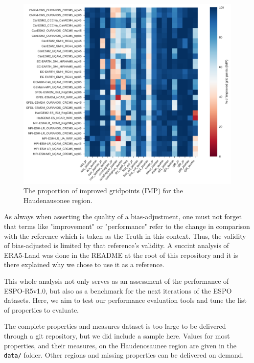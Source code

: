 \documentclass[letterpaper,10pt]{article}
\begin{document}
\begin{figure}
    \centering
    \includegraphics[width=\textwidth]{../images/overall_improvement.pdf}
    \caption{The proportion of improved gridpoints (IMP) for the Haudenausonee region.}\label{fig:imp}
\end{figure}

As always when asserting the quality of a bias-adjustment, one must not forget that terms like "improvement" or "performance" refer to the change in comparison with the reference which is taken as the Truth in this context. Thus, the validity of bias-adjusted is limited by that reference's validity. A succint analysis of ERA5-Land was done in the README at the root of this repository and it is there explained why we chose to use it as a reference.

This whole analysis not only serves as an assessment of the performance of ESPO-R5v1.0, but also as a benchmark for the next iterations of the ESPO datasets. Here, we aim to test our performance evaluation tools and tune the list of properties to evaluate.


The complete properties and measures dataset is too large to be delivered through a git repository, but we did include a sample here. Values for most properties, and their measures, on the Haudenosaunee region are given in the \texttt{data/} folder. Other regions and missing properties can be delivered on demand.
\end{document}
